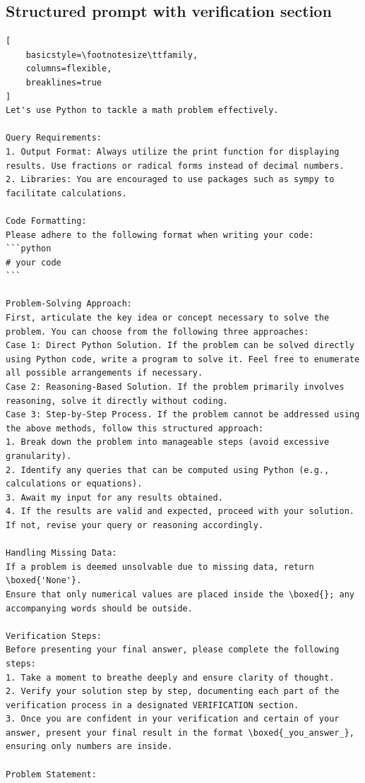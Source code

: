 \subsection{Structured prompt with verification section}
\label{sec:ag2-mathchat-improved-prompt}
\begin{lstlisting}[
    basicstyle=\footnotesize\ttfamily,
    columns=flexible,
    breaklines=true
]
Let's use Python to tackle a math problem effectively.

Query Requirements:
1. Output Format: Always utilize the print function for displaying results. Use fractions or radical forms instead of decimal numbers.
2. Libraries: You are encouraged to use packages such as sympy to facilitate calculations.

Code Formatting:
Please adhere to the following format when writing your code:
```python
# your code
```

Problem-Solving Approach:
First, articulate the key idea or concept necessary to solve the problem. You can choose from the following three approaches:
Case 1: Direct Python Solution. If the problem can be solved directly using Python code, write a program to solve it. Feel free to enumerate all possible arrangements if necessary.
Case 2: Reasoning-Based Solution. If the problem primarily involves reasoning, solve it directly without coding.
Case 3: Step-by-Step Process. If the problem cannot be addressed using the above methods, follow this structured approach:
1. Break down the problem into manageable steps (avoid excessive granularity).
2. Identify any queries that can be computed using Python (e.g., calculations or equations).
3. Await my input for any results obtained.
4. If the results are valid and expected, proceed with your solution. If not, revise your query or reasoning accordingly.

Handling Missing Data:
If a problem is deemed unsolvable due to missing data, return \boxed{'None'}. 
Ensure that only numerical values are placed inside the \boxed{}; any accompanying words should be outside.

Verification Steps:
Before presenting your final answer, please complete the following steps:
1. Take a moment to breathe deeply and ensure clarity of thought.
2. Verify your solution step by step, documenting each part of the verification process in a designated VERIFICATION section.
3. Once you are confident in your verification and certain of your answer, present your final result in the format \boxed{_you_answer_}, ensuring only numbers are inside.

Problem Statement: 
\end{lstlisting}


